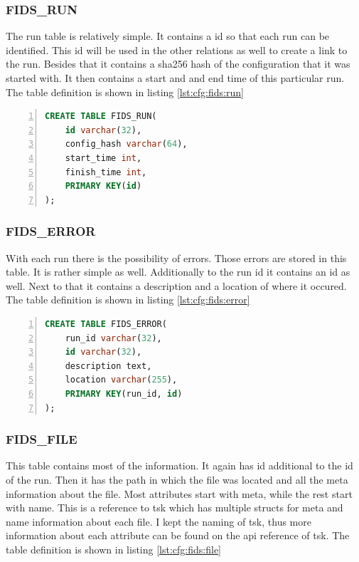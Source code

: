 \documentclass[
	a4paper,					%
	10pt,							%
	twoside,					%
	openright,				%
	notitlepage,			%
	parskip=half,			%
]{scrreprt}					%
\begin{document}
\subsubsection{FIDS\_RUN}

The run table is relatively simple. It contains a \gls{id} so that each run can be identified. This \gls{id} will be used in the other relations as well to create a link to the run. Besides that it contains a \gls{sha256} hash of the configuration that it was started with. It then contains a start and and end time of this particular run. The table definition is shown in listing \ref{lst:cfg:fids:run}

\begin{lstlisting}[language=sql, numbers=left, caption=Fids Run Table Definition, label=lst:cfg:fids:run]
CREATE TABLE FIDS_RUN(
	id varchar(32), 
	config_hash varchar(64), 
	start_time int, 
	finish_time int, 
	PRIMARY KEY(id)
);
\end{lstlisting}



\subsubsection{FIDS\_ERROR}

With each run there is the possibility of errors. Those errors are stored in this table. It is rather simple as well. Additionally to the run \gls{id} it contains an \gls{id} as well. Next to that it contains a description and a location of where it occured. The table definition is shown in listing \ref{lst:cfg:fids:error}

\begin{lstlisting}[language=sql, numbers=left, caption=Fids Error Table Definition, label=lst:cfg:fids:error]
CREATE TABLE FIDS_ERROR(
	run_id varchar(32), 
	id varchar(32), 
	description text, 
	location varchar(255), 
	PRIMARY KEY(run_id, id)
);
\end{lstlisting}

\subsubsection{FIDS\_FILE}

This table contains most of the information. It again has \gls{id} additional to the \gls{id} of the run. Then it has the path in which the file was located and all the meta information about the file. Most attributes start with meta, while the rest start with name. This is a reference to \gls{tsk} which has multiple structs for meta and name information about each file. I kept the naming of \gls{tsk}, thus more information about each attribute can be found on the \gls{api} reference of \gls{tsk}. \cite{tsk:file:struct} The table definition is shown in listing \ref{lst:cfg:fids:file}
\end{document}

